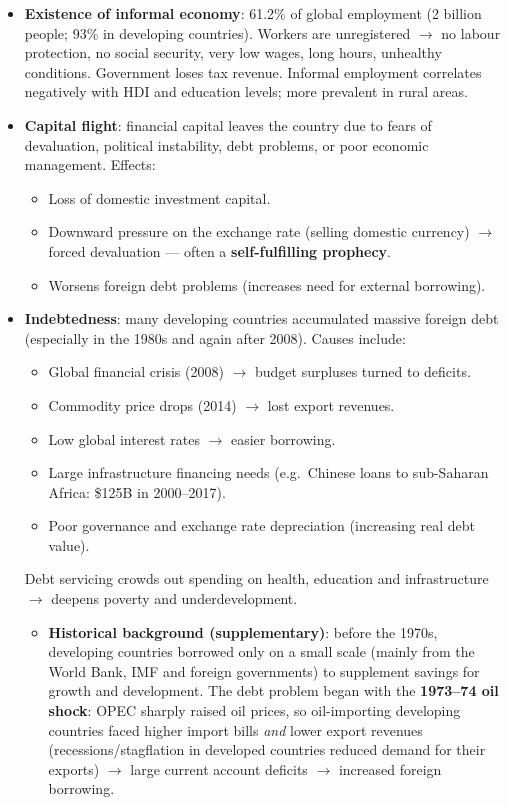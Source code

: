 \begin{itemize}
\begin{itemize}
    \item \textbf{Non-tariff barriers} (``new trade protection''): health/safety standards, administrative barriers, environmental standards --- sometimes used as hidden protection against developing-country exports.
  \end{itemize}
  \item \textbf{Existence of informal economy}: 61.2\% of global employment (2 billion people; 93\% in developing countries). Workers are unregistered $\to$ no labour protection, no social security, very low wages, long hours, unhealthy conditions. Government loses tax revenue. Informal employment correlates negatively with HDI and education levels; more prevalent in rural areas.
  \item \textbf{Capital flight}: financial capital leaves the country due to fears of devaluation, political instability, debt problems, or poor economic management. Effects:
  \begin{itemize}
    \item Loss of domestic investment capital.
    \item Downward pressure on the exchange rate (selling domestic currency) $\to$ forced devaluation --- often a \textbf{self-fulfilling prophecy}.
    \item Worsens foreign debt problems (increases need for external borrowing).
  \end{itemize}
  \item \textbf{Indebtedness}: many developing countries accumulated massive foreign debt (especially in the 1980s and again after 2008). Causes include:
  \begin{itemize}
    \item Global financial crisis (2008) $\to$ budget surpluses turned to deficits.
    \item Commodity price drops (2014) $\to$ lost export revenues.
    \item Low global interest rates $\to$ easier borrowing.
    \item Large infrastructure financing needs (e.g.\ Chinese loans to sub-Saharan Africa: \$125B in 2000--2017).
    \item Poor governance and exchange rate depreciation (increasing real debt value).
  \end{itemize}
  Debt servicing crowds out spending on health, education and infrastructure $\to$ deepens poverty and underdevelopment.
  \begin{itemize}
    \item \textbf{Historical background (supplementary)}: before the 1970s, developing countries borrowed only on a small scale (mainly from the World Bank, IMF and foreign governments) to supplement savings for growth and development. The debt problem began with the \textbf{1973--74 oil shock}: OPEC sharply raised oil prices, so oil-importing developing countries faced higher import bills \textit{and} lower export revenues (recessions/stagflation in developed countries reduced demand for their exports) $\to$ large current account deficits $\to$ increased foreign borrowing.

\end{itemize}
\end{itemize}
